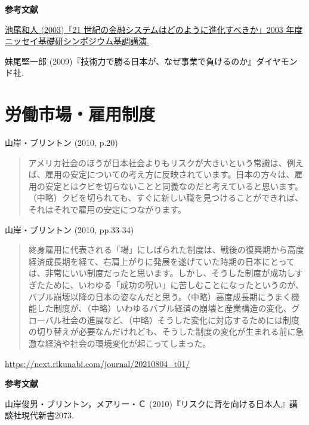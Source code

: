 \documentclass[
]{book}
\begin{document}
{\textbf{参考文献}}

\href{https://www.nli-research.co.jp/files/user/pdf/publicity/event/03kicho.pdf?site=nli}{池尾和人 (2003)「21 世紀の金融システムはどのように進化すべきか」2003 年度 ニッセイ基礎研シンポジウム基調講演.}

妹尾堅一郎 (2009)『技術力で勝る日本が、なぜ事業で負けるのか』ダイヤモンド社.

\hypertarget{labor}{%
\section{労働市場・雇用制度}\label{labor}}

山岸・ブリントン (2010, p.20)

\begin{quote}
アメリカ社会のほうが日本社会よりもリスクが大きいという常識は、例えば、雇用の安定についての考え方に反映されています。日本の方々は、雇用の安定とはクビを切らないことと同義なのだと考えていると思います。（中略）クビを切られても、すぐに新しい職を見つけることができれば、それはそれで雇用の安定につながります。
\end{quote}

山岸・ブリントン (2010, pp.33-34)

\begin{quote}
終身雇用に代表される「場」にしばられた制度は、戦後の復興期から高度経済成長期を経て、右肩上がりに発展を遂げていた時期の日本にとっては、非常にいい制度だったと思います。しかし、そうした制度が成功しすぎたために、いわゆる「成功の呪い」に苦しむことになったというのが、バブル崩壊以降の日本の姿なんだと思う。（中略）高度成長期にうまく機能した制度が、（中略）いわゆるバブル経済の崩壊と産業構造の変化、グローバル社会の進展など、（中略）そうした変化に対応するためには制度の切り替えが必要なんだけれども、そうした制度の変化が生まれる前に急激な経済や社会の環境変化が起こってしまった。
\end{quote}

\url{https://next.rikunabi.com/journal/20210804_t01/}

{\textbf{参考文献}}

山岸俊男・ブリントン，メアリー・Ｃ (2010)『リスクに背を向ける日本人』講談社現代新書2073.

  
\end{document}
